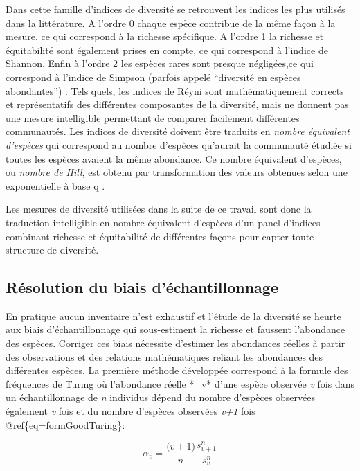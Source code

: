 \documentclass[
  11pt,
  french,
  A4paper,
  extrafontsizes,onecolumn,openright
  ]{memoir}
\begin{document}
Dans cette famille d'indices de diversité se retrouvent les indices les
plus utilisés dans la littérature. A l'ordre 0 chaque espèce contribue
de la même façon à la mesure, ce qui correspond à la richesse
spécifique. A l'ordre 1 la richesse et équitabilité sont également
prises en compte, ce qui correspond à l'indice de Shannon. Enfin à
l'ordre 2 les espèces rares sont presque négligées,ce qui correspond à
l'indice de Simpson (parfois appelé ``diversité en espèces abondantes'')
\autocites{Shannon1948}{Simpson1949}{Patil1982}{Tothmeresz1995}. Tels
quels, les indices de Réyni sont mathématiquement corrects et
représentatifs des différentes composantes de la diversité, mais ne
donnent pas une mesure intelligible permettant de comparer facilement
différentes communautés. Les indices de diversité doivent être traduits
en \emph{nombre équivalent d'espèces} qui correspond au nombre d'espèces
qu'aurait la communauté étudiée si toutes les espèces avaient la même
abondance. Ce nombre équivalent d'espèces, ou \emph{nombre de Hill}, est
obtenu par transformation des valeurs obtenues selon une exponentielle à
base q \autocite{Hill1973}.

Les mesures de diversité utilisées dans la suite de ce travail sont donc
la traduction intelligible en nombre équivalent d'espèces d'un panel
d'indices combinant richesse et équitabilité de différentes façons pour
capter toute structure de diversité.

\subsection{Résolution du biais
d'échantillonnage}\label{resolution-du-biais-dechantillonnage}

En pratique aucun inventaire n'est exhaustif et l'étude de la diversité
se heurte aux biais d'échantillonnage qui sous-estiment la richesse et
faussent l'abondance des espèces. Corriger ces biais nécessite d'estimer
les abondances réelles à partir des observations et des relations
mathématiques reliant les abondances des différentes espèces. La
première méthode développée correspond à la formule des fréquences de
Turing \autocite{Good1953} où l'abondance réelle *\alpha\_v* d'une
espèce observée \emph{v} fois dans un échantillonnage de \emph{n}
individus dépend du nombre d'espèces observées également \emph{v} fois
et du nombre d'espèces observées \emph{v+1} fois
@ref\{eq=formGoodTuring\}:

\begin{equation}
\alpha_v=\frac{\big(v+1\big)}{n}\frac{s^n_{v+1}}{s^n_v}
\label{eq:formGoodTuring}
\end{equation}
\end{document}
